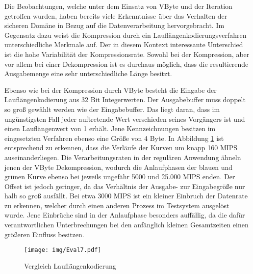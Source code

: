 Die Beobachtungen, welche unter dem Einsatz von VByte und der Iteration getroffen wurden, haben bereits viele Erkenntnisse über das Verhalten der sicheren Domäne in Bezug auf die Datenverarbeitung hervorgebracht. Im Gegensatz dazu weist die Kompression durch ein Lauflängenkodierungsverfahren unterschiedliche Merkmale auf. Der in diesem Kontext interessante Unterschied ist die hohe Variabilität der Kompressionsrate. Sowohl bei der Kompression, aber vor allem bei einer Dekompression ist es durchaus möglich, dass die resultierende Ausgabemenge eine sehr unterschiedliche Länge besitzt.

Ebenso wie bei der Kompression durch VByte besteht die Eingabe der Lauflängenkodierung aus 32 Bit Integerwerten. Der Ausgabebuffer muss doppelt so groß gewählt werden wie der Eingabebuffer. Das liegt daran, dass im ungünstigsten Fall jeder auftretende Wert verschieden seines Vorgängers ist und einen Lauflängenwert von 1 erhält. Jene Kennzeichnungen besitzen im eingesetzten Verfahren ebenso eine Größe von 4 Byte. In Abbildung \ref{fig:eval7} ist entsprechend zu erkennen, dass die Verläufe der Kurven um knapp 160 \ac{MIPS} auseinanderliegen. Die Verarbeitungsraten in der regulären Anwendung ähneln jenen der VByte Dekompression, wodurch die Anlaufphasen der blauen und grünen Kurve ebenso bei jeweils ungefähr 5000 und 25.000 \ac{MIPS} enden. Der Offset ist jedoch geringer, da das Verhältnis der Ausgabe- zur Eingabegröße nur halb so groß ausfällt. Bei etwa 3000 \ac{MIPS} ist ein kleiner Einbruch der Datenrate zu erkennen, welcher durch einen anderen Prozess im Testsystem ausgelöst wurde. Jene Einbrüche sind in der Anlaufphase besonders auffällig, da die dafür verantwortlichen Unterbrechungen bei den anfänglich kleinen Gesamtzeiten einen größeren Einfluss besitzen.

\begin{figure}[h]
	\texttt{[image: img/Eval7.pdf]}
	\centering
	\caption{Vergleich Lauflängenkodierung}
	\label{fig:eval7}
\end{figure}

